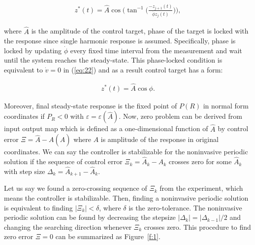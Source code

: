 \documentclass[openacc]{rsproca_new}%
\def\epsilon{\varepsilon}
\newcommand{\Eref}[1]{(\ref{#1})}
\newcommand{\Fref}[1]{Figure~\ref{#1}}
\begin{document}
\begin{align}\label{eq:26}
z^*(t)=\hat A\cos\Big(\tan^{-1}\Big({\frac{-z_{j+1}(t)}{ \dot \phi z_{j}(t)}}\Big) \Big),
\end{align}

\noindent where $\hat A$ is the amplitude of the control target, phase of the target is locked with the response since single harmonic response is assumed. Specifically, phase is locked by updating $\dot\phi$ every fixed time interval from the measurement and wait until the system reaches the steady-state. This phase-locked condition is equivalent to $\dot v=0$ in \Eref{eq:22} and as a result control target has a form:

\begin{align}\label{eq:tg}
 z^*(t)=\hat A\cos{\phi}.
\end{align}

\noindent Moreover, final steady-state response is the fixed point of $P(R)$ in normal form coordinates if $P_R<0$ with $\epsilon=\epsilon(\hat A)$. Now, zero problem can be derived from input output map which is defined as a one-dimensional function of $\hat A$ by control error $\Xi=\hat A - A(\hat A)$ where $A$ is amplitude of the response in original coordinates. We can say the controller is stabilizable for the noninvasive periodic solution if the sequence of control error $\Xi_k=\hat A_k-A_k$ crosses zero for some $\hat A_k$ with step size $\Delta_k=\hat A_{k+1}-\hat A_{k}$.

Let us say we found a zero-crossing sequence of $\Xi_k$ from the experiment, which means the controller is stabilizable. Then, finding a noninvasive periodic solution is equivalent to finding  $|\Xi_k|<\delta$, where $\delta$ is the zero-tolerance. The noninvasive periodic solution can be found by decreasing the stepsize $|\Delta_k|=|\Delta_{k-1}|/2$ and changing the searching direction whenever $\Xi_k$ crosses zero. This procedure to find zero error $\Xi=0$ can be summarized as \Fref{f:1}.
\end{document}
